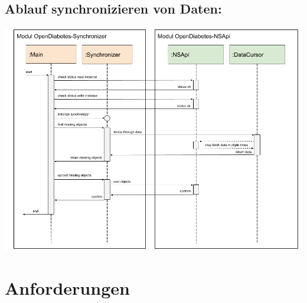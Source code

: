 \documentclass[accentcolor=tud0b,12pt,paper=a4]{tudreport}
\begin{document}
\newpage
\section*{Ablauf synchronizieren von Daten:}
\includegraphics[width=1\textwidth]{SequenzdiagrammSynchronizer.png}


	

 \chapter{Anforderungen}
\end{document}
